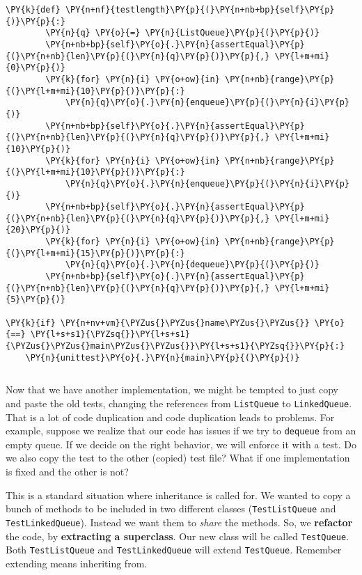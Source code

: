 \begin{Verbatim}[commandchars=\\\{\}]
    \PY{k}{def} \PY{n+nf}{testlength}\PY{p}{(}\PY{n+nb+bp}{self}\PY{p}{)}\PY{p}{:}
        \PY{n}{q} \PY{o}{=} \PY{n}{ListQueue}\PY{p}{(}\PY{p}{)}
        \PY{n+nb+bp}{self}\PY{o}{.}\PY{n}{assertEqual}\PY{p}{(}\PY{n+nb}{len}\PY{p}{(}\PY{n}{q}\PY{p}{)}\PY{p}{,} \PY{l+m+mi}{0}\PY{p}{)}
        \PY{k}{for} \PY{n}{i} \PY{o+ow}{in} \PY{n+nb}{range}\PY{p}{(}\PY{l+m+mi}{10}\PY{p}{)}\PY{p}{:}
            \PY{n}{q}\PY{o}{.}\PY{n}{enqueue}\PY{p}{(}\PY{n}{i}\PY{p}{)}
        \PY{n+nb+bp}{self}\PY{o}{.}\PY{n}{assertEqual}\PY{p}{(}\PY{n+nb}{len}\PY{p}{(}\PY{n}{q}\PY{p}{)}\PY{p}{,} \PY{l+m+mi}{10}\PY{p}{)}
        \PY{k}{for} \PY{n}{i} \PY{o+ow}{in} \PY{n+nb}{range}\PY{p}{(}\PY{l+m+mi}{10}\PY{p}{)}\PY{p}{:}
            \PY{n}{q}\PY{o}{.}\PY{n}{enqueue}\PY{p}{(}\PY{n}{i}\PY{p}{)}
        \PY{n+nb+bp}{self}\PY{o}{.}\PY{n}{assertEqual}\PY{p}{(}\PY{n+nb}{len}\PY{p}{(}\PY{n}{q}\PY{p}{)}\PY{p}{,} \PY{l+m+mi}{20}\PY{p}{)}
        \PY{k}{for} \PY{n}{i} \PY{o+ow}{in} \PY{n+nb}{range}\PY{p}{(}\PY{l+m+mi}{15}\PY{p}{)}\PY{p}{:}
            \PY{n}{q}\PY{o}{.}\PY{n}{dequeue}\PY{p}{(}\PY{p}{)}
        \PY{n+nb+bp}{self}\PY{o}{.}\PY{n}{assertEqual}\PY{p}{(}\PY{n+nb}{len}\PY{p}{(}\PY{n}{q}\PY{p}{)}\PY{p}{,} \PY{l+m+mi}{5}\PY{p}{)}

\PY{k}{if} \PY{n+nv+vm}{\PYZus{}\PYZus{}name\PYZus{}\PYZus{}} \PY{o}{==} \PY{l+s+s1}{\PYZsq{}}\PY{l+s+s1}{\PYZus{}\PYZus{}main\PYZus{}\PYZus{}}\PY{l+s+s1}{\PYZsq{}}\PY{p}{:}
    \PY{n}{unittest}\PY{o}{.}\PY{n}{main}\PY{p}{(}\PY{p}{)}
\end{Verbatim}

\begin{Verbatim}
\end{Verbatim}


Now that we have another implementation, we might be tempted to just copy and paste the old tests, changing the references from \texttt{ListQueue} to \texttt{LinkedQueue}.
That is a lot of code duplication and code duplication leads to problems.
For example, suppose we realize that our code has issues if we try to \texttt{dequeue} from an empty queue.
If we decide on the right behavior, we will enforce it with a test.
Do we also copy the test to the other (copied) test file?
What if one implementation is fixed and the other is not?


This is a standard situation where inheritance is called for.
We wanted to copy a bunch of methods to be included in two different classes (\texttt{TestListQueue} and \texttt{TestLinkedQueue}).
Instead we want them to \emph{share} the methods.
So, we \textbf{refactor} the code, by \textbf{extracting a superclass}.
Our new class will be called \texttt{TestQueue}.
Both \texttt{TestListQueue} and \texttt{TestLinkedQueue} will extend \texttt{TestQueue}.
Remember extending means inheriting from.

